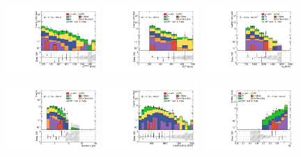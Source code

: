\begin{figure}[ht!]
  \begin{center}

    \includegraphics[width=0.32\textwidth]{images_tmp/results/fr2/can_VRL4_ph_pt0_afterFit.pdf}
    \includegraphics[width=0.32\textwidth]{images_tmp/results/fr2/can_VRL4_met_et_afterFit.pdf}
    \includegraphics[width=0.32\textwidth]{images_tmp/results/fr2/can_VRL4_meff_afterFit.pdf}

    \includegraphics[width=0.32\textwidth]{images_tmp/results/fr2/can_VRL4_jet_n_afterFit}
    \includegraphics[width=0.32\textwidth]{images_tmp/results/fr2/can_VRL4_jet_pt0_afterFit.pdf}
    \includegraphics[width=0.32\textwidth]{images_tmp/results/fr2/can_VRL4_rt4_afterFit}


\end{center}
\end{figure}

